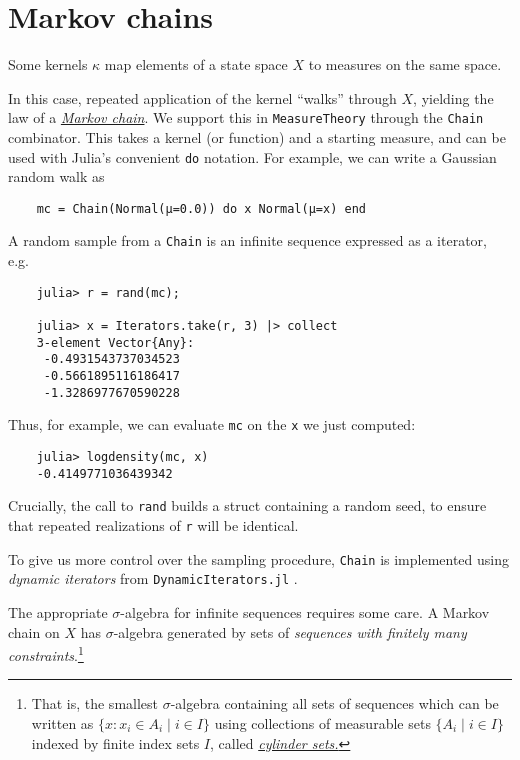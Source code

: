 \documentclass{juliacon}
\begin{document}
\section{Markov chains}

Some kernels $\kappa$ map elements of a state space $X$ to measures on the same space.

In this case, repeated application of the kernel ``walks'' through $X$, yielding the law of a \href{https://en.wikipedia.org/wiki/Markov_chain}{\emph{Markov chain}}. We support this in \verb|MeasureTheory| through the \verb|Chain| combinator. This takes a kernel (or function) and a starting measure, and can be used with Julia's convenient \verb|do| notation. For example, we can write a Gaussian random walk as

\begin{verbatim}
    mc = Chain(Normal(μ=0.0)) do x Normal(μ=x) end
\end{verbatim}

A random sample from a \verb|Chain| is an infinite sequence expressed as a iterator, e.g.

\begin{verbatim}
    julia> r = rand(mc);

    julia> x = Iterators.take(r, 3) |> collect
    3-element Vector{Any}:
     -0.4931543737034523
     -0.5661895116186417
     -1.3286977670590228
\end{verbatim}



Thus, for example, we can evaluate \verb|mc| on the \verb|x| we just computed:
\begin{verbatim}
    julia> logdensity(mc, x)
    -0.4149771036439342
\end{verbatim}

Crucially, the call to \verb|rand| builds a struct containing a random seed, to ensure that repeated realizations of \verb|r| will be identical.

To give us more control over the sampling procedure, \verb|Chain| is implemented using \emph{dynamic iterators} from \verb|DynamicIterators.jl| \cite{DynamicIterators.jl}.

The appropriate $\sigma$-algebra for infinite sequences requires some care. A Markov chain on $X$ has $\sigma$-algebra generated by sets of \emph{sequences with finitely many constraints}.\footnote{That is,  the smallest $\sigma$-algebra containing all sets of sequences which can be written as $\{x \colon x_i \in A_i \mid i \in I\}$ using collections of measurable sets $\{A_i \mid i\in I\}$ indexed by finite index sets $I$, called \href{https://en.wikipedia.org/wiki/Cylinder_set_measure}{\emph{cylinder sets.}}}
\end{document}
